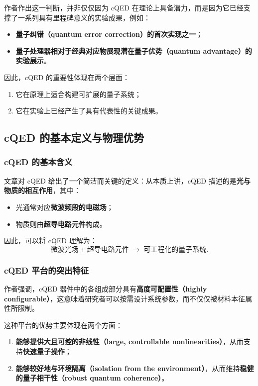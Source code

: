\documentclass[12pt,a4paper,oneside]{ctexbook}
\begin{document}
作者作出这一判断，并非仅仅因为 cQED 在理论上具备潜力，而是因为它已经支撑了一系列具有里程碑意义的实验成果，例如：
\begin{itemize}[leftmargin=2em]
    \item \textbf{量子纠错（quantum error correction）的首次实现之一}；
    \item \textbf{量子处理器相对于经典对应物展现潜在量子优势（quantum advantage）的实验展示}。
\end{itemize}

因此，cQED 的重要性体现在两个层面：
\begin{enumerate}[leftmargin=2em]
    \item 它在原理上适合构建可扩展的量子系统；
    \item 它在实验上已经产生了具有代表性的关键成果。
\end{enumerate}

\subsection{cQED 的基本定义与物理优势}

\subsubsection{cQED 的基本含义}

文章对 cQED 给出了一个简洁而关键的定义：从本质上讲，cQED 描述的是\textbf{光与物质的相互作用}，其中：
\begin{itemize}[leftmargin=2em]
    \item 光通常对应\textbf{微波频段的电磁场}；
    \item 物质则由\textbf{超导电路元件}构成。
\end{itemize}

因此，可以将 cQED 理解为：
\[
\text{微波光场} + \text{超导电路元件}
\;\longrightarrow\;
\text{可工程化的量子系统}.
\]

\subsubsection{cQED 平台的突出特征}

作者强调，cQED 器件中的各组成部分具有\textbf{高度可配置性（highly configurable）}，这意味着研究者可以按需设计系统参数，而不仅仅被材料本征属性所限制。

这种平台的优势主要体现在两个方面：
\begin{enumerate}[leftmargin=2em]
    \item \textbf{能够提供大且可控的非线性（large, controllable nonlinearities）}，从而支持\textbf{快速量子操作}；
    \item \textbf{能够较好地与环境隔离（isolation from the environment）}，从而维持\textbf{稳健的量子相干性（robust quantum coherence）}。
\end{enumerate}
\end{document}
